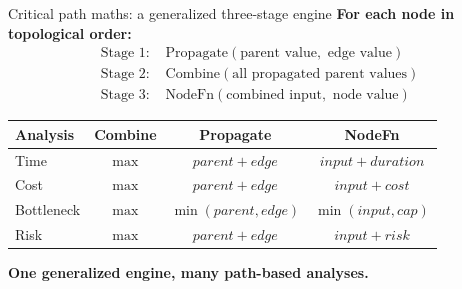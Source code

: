 \documentclass[aspectratio=169]{beamer}
\begin{document}
\begin{frame}{Critical path maths: a generalized three-stage engine}
\small
\textbf{For each node in topological order:}
\begin{align*}
\text{Stage 1: } &\mathrm{Propagate}(\text{parent value},\text{ edge value}) \\
\text{Stage 2: } &\mathrm{Combine}(\text{all propagated parent values}) \\
\text{Stage 3: } &\mathrm{NodeFn}(\text{combined input},\text{ node value})
\end{align*}

\vspace{0.2cm}
\begin{center}
\begin{tabular}{|l|c|c|c|}
\hline
\textbf{Analysis} & \textbf{Combine} & \textbf{Propagate} & \textbf{NodeFn} \\
\hline
Time & $\max$ & $parent + edge$ & $input + duration$ \\
Cost & $\max$ & $parent + edge$ & $input + cost$ \\
Bottleneck & $\max$ & $\min(parent,edge)$ & $\min(input,cap)$ \\
Risk & $\max$ & $parent + edge$ & $input + risk$ \\
\hline
\end{tabular}
\end{center}

\vspace{0.15cm}
\centering
\textcolor{juliablue}{\textbf{One generalized engine, many path-based analyses.}}
\end{frame}
\end{document}
